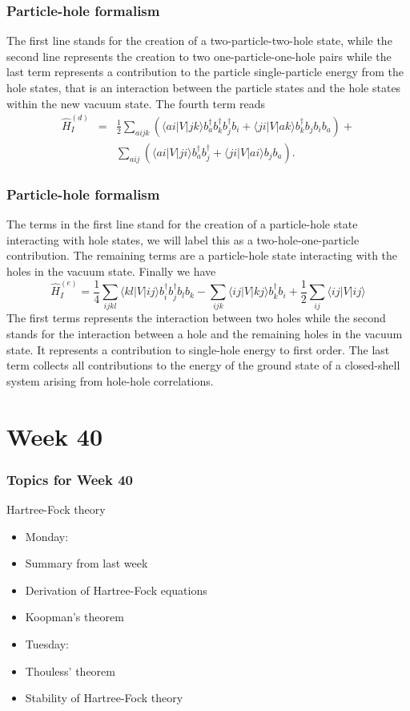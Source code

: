 \documentclass[compress]{beamer}
\newcommand*{\ket}[1]{|#1\rangle}
\newcommand*{\bra}[1]{\langle#1|}
\newcommand{\element}[3]
        {\bra{#1}#2\ket{#3}}
\begin{document}
\frame
{
  \frametitle{Particle-hole formalism}
\begin{small}
{\scriptsize
The first line stands for the creation of a two-particle-two-hole state, while the second line represents
the creation to two one-particle-one-hole pairs
while the last term represents a contribution to the particle single-particle energy
from the hole states, that is an interaction between the particle states and the hole states
within the new vacuum  state.
The fourth term reads
\begin{eqnarray}
	 \hat{H}_I^{(d)}& = &\frac{1}{2} 
	 	\sum_{aijk}\left(\element{ai}{V}{jk}b_a^\dagger b_k^\dagger b_j^\dagger b_i+
\element{ji}{V}{ak}b_k^\dagger b_j b_i b_a\right)+\nonumber \\
&&\sum_{aij}\left(\element{ai}{V}{ji}b_a^\dagger b_j^\dagger+\element{ji}{V}{ai}b_j b_a \right). \nonumber
\end{eqnarray}
}
\end{small}
}


\frame
{
  \frametitle{Particle-hole formalism}
\begin{small}
{\scriptsize
The terms in the first line  stand for the creation of a particle-hole state 
interacting with hole states, we will label this as a two-hole-one-particle contribution. 
The remaining terms are a particle-hole state interacting with the holes in the vacuum state. 
Finally we have 
\[
	\hat{H}_I^{(e)} = \frac{1}{4}
		 \sum_{ijkl}
		 \element{kl}{V}{ij}b_i^\dagger b_j^\dagger b_l b_k
	        -\sum_{ijk}\element{ij}{V}{kj}b_k^\dagger b_i
	        +\frac{1}{2}\sum_{ij}\element{ij}{V}{ij}
\]
The first terms represents the 
interaction between two holes while the second stands for the interaction between a hole and the remaining holes in the vacuum state.
It represents a contribution to single-hole energy  to first order.
The last term collects all contributions to the energy of the ground state of a closed-shell system arising
from hole-hole correlations.
}
\end{small}
}


\section[Week 40]{Week 40}
\frame
{
  \frametitle{Topics for Week 40}
  \begin{block}{Hartree-Fock theory}
\begin{itemize}
\item Monday:
\item Summary from last week
\item Derivation of Hartree-Fock equations
\item Koopman's theorem
\item Tuesday:
\item Thouless' theorem
\item Stability of Hartree-Fock theory
\end{itemize}

  \end{block}
} 
\end{document}
